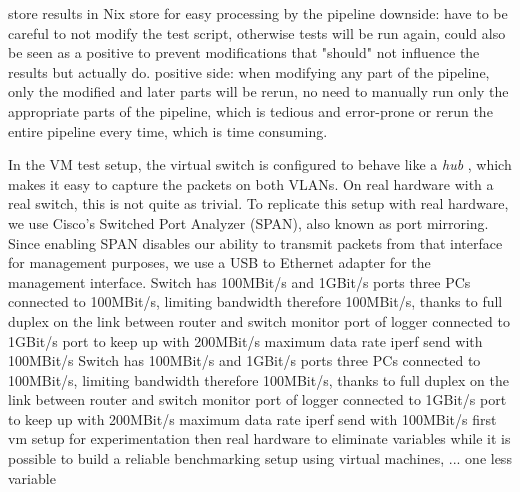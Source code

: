 store results in Nix store for easy processing by the pipeline
downside: have to be careful to not modify the test script, otherwise tests will be run again, could also be seen as a positive to prevent modifications that "should" not influence the results but actually do.
positive side: when modifying any part of the pipeline, only the modified and later parts will be rerun, no need to manually run only the appropriate parts of the pipeline, which is tedious and error-prone or rerun the entire pipeline every time, which is time consuming.


In the VM test setup, the virtual switch is configured to behave like a \textit{hub} \cite{wiki:Ethernet_hub} \cite{NixOS-VM-test-Hub}, which makes it easy to capture the packets on both VLANs.
On real hardware with a real switch, this is not quite as trivial.
To replicate this setup with real hardware, we use Cisco's Switched Port Analyzer (SPAN), also known as port mirroring.
Since enabling SPAN disables our ability to transmit packets from that interface for management purposes, we use a USB to Ethernet adapter for the management interface.
Switch has 100MBit/s and 1GBit/s ports
three PCs connected to 100MBit/s, limiting bandwidth therefore 100MBit/s, thanks to full duplex on the link between router and switch
monitor port of logger connected to 1GBit/s port to keep up with 200MBit/s maximum data rate
iperf send with 100MBit/s
Switch has 100MBit/s and 1GBit/s ports
three PCs connected to 100MBit/s, limiting bandwidth therefore 100MBit/s, thanks to full duplex on the link between router and switch
monitor port of logger connected to 1GBit/s port to keep up with 200MBit/s maximum data rate
iperf send with 100MBit/s
first vm setup for experimentation
then real hardware to eliminate variables
while it is possible to build a reliable benchmarking setup using virtual machines, ...
one less variable

